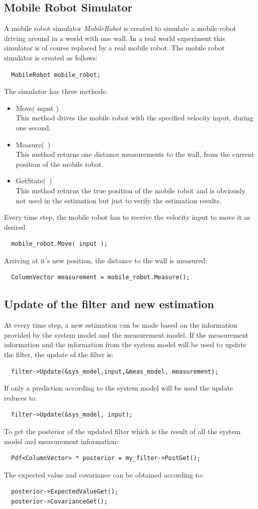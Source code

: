 \documentclass[a4paper,10pt]{report}
\begin{document}
\subsection{Mobile Robot Simulator}
A mobile robot simulator \emph{MobileRobot} is created to simulate a
mobile robot driving around in a world with one wall. In a real world
experiment this simulator is of course replaced by a real mobile
robot. The mobile robot simulator is created as follows:
\begin{verbatim}
  MobileRobot mobile_robot;
\end{verbatim}
The simulator has three methods:
\begin{itemize}
\item Move( input )\\
  This method drives the mobile robot with the specified
  velocity input, during one second.
\item Measure(~)\\
  This method returns one distance measurements to the wall, from the
  current position of the mobile robot.
\item GetState(~)\\
  This method returns the true position of the mobile robot and is
  obviously not used in the estimation but just to verify the
  estimation results.
\end{itemize}
Every time step, the mobile robot has to receive the velocity input to
move it as desired
\begin{verbatim}
  mobile_robot.Move( input );
\end{verbatim}
Arriving at it's new position, the distance to the wall is measured:
\begin{verbatim}
  ColumnVector measurement = mobile_robot.Measure();
\end{verbatim}




\subsection{Update of the filter and new estimation}
At every time step, a new estimation can be made based on the
information provided by the system model and the measurement model.
If the measurement information and the information from the system
model will be used to update the filter, the update of the filter is:
\begin{verbatim}
  filter->Update(&sys_model,input,&meas_model, measurement);
\end{verbatim}
If only a prediction according to the system
model will be used the update reduces to:
\begin{verbatim}
  filter->Update(&sys_model, input);
\end{verbatim}
To get the posterior of the updated filter which is the result of all
the system model and measurement information:
\begin{verbatim}
  Pdf<ColumnVector> * posterior = my_filter->PostGet();
\end{verbatim}
The expected value and covariance can be obtained according to:
\begin{verbatim}
  posterior->ExpectedValueGet();
  posterior->CovarianceGet();
\end{verbatim}
\end{document}
